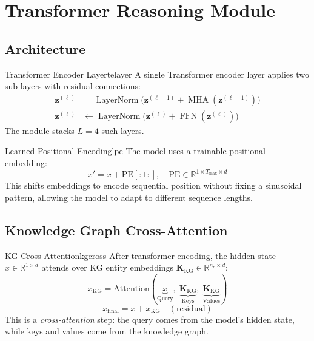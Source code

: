 \documentclass[12pt,a4paper]{article}
\newcommand{\MHA}{\operatorname{MHA}}
\newcommand{\LN}{\operatorname{LayerNorm}}
\newcommand{\FFN}{\operatorname{FFN}}
\newcommand{\R}{\mathbb{R}}
\begin{document}
\section{Transformer Reasoning Module}

\subsection{Architecture}

\begin{definition}{Transformer Encoder Layer}{telayer}
A single Transformer encoder layer applies two sub-layers with residual connections:
\begin{align}
  \mathbf{z}^{(\ell)} &=
    \LN\!\bigl(\mathbf{z}^{(\ell-1)} + \MHA(\mathbf{z}^{(\ell-1)})\bigr)
    \label{eq:enc1} \\
  \mathbf{z}^{(\ell)} &\leftarrow
    \LN\!\bigl(\mathbf{z}^{(\ell)} + \FFN(\mathbf{z}^{(\ell)})\bigr)
    \label{eq:enc2}
\end{align}
The module stacks $L=4$ such layers.
\end{definition}

\begin{definition}{Learned Positional Encoding}{lpe}
The model uses a trainable positional embedding:
\[
  x' = x + \text{PE}[:\!1\!:],
  \quad \text{PE} \in \R^{1 \times T_{\max} \times d}
\]
This shifts embeddings to encode sequential position without fixing a sinusoidal
pattern, allowing the model to adapt to different sequence lengths.
\end{definition}

\subsection{Knowledge Graph Cross-Attention}

\begin{definition}{KG Cross-Attention}{kgcross}
After transformer encoding, the hidden state $x \in \R^{1 \times d}$ attends
over KG entity embeddings $\mathbf{K}_{\text{KG}} \in \R^{n_e \times d}$:
\[
  x_{\text{KG}} = \text{Attention}(
    \underbrace{x}_{\text{Query}},\;
    \underbrace{\mathbf{K}_{\text{KG}}}_{\text{Keys}},\;
    \underbrace{\mathbf{K}_{\text{KG}}}_{\text{Values}})
\]
\[
  x_{\text{final}} = x + x_{\text{KG}} \quad (\text{residual})
\]
This is a \emph{cross-attention} step: the query comes from the model's hidden state,
while keys and values come from the knowledge graph.
\end{definition}
\end{document}

